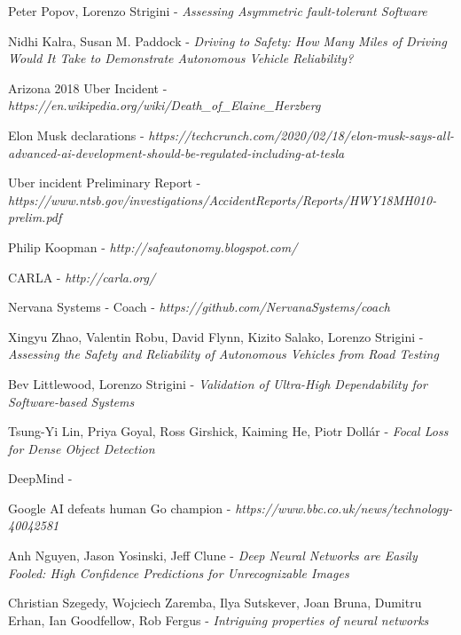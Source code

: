\begin{thebibliography}{9}

Peter Popov, Lorenzo Strigini - \textit{Assessing Asymmetric fault-tolerant Software}

Nidhi Kalra, Susan M. Paddock - \textit{Driving to Safety: How Many Miles of Driving Would It Take to Demonstrate Autonomous Vehicle Reliability?}

Arizona 2018 Uber Incident - \textit{https://en.wikipedia.org/wiki/Death\_of\_Elaine\_Herzberg}

Elon Musk declarations - \textit{https://techcrunch.com/2020/02/18/elon-musk-says-all-advanced-ai-development-should-be-regulated-including-at-tesla}

Uber incident Preliminary Report - \textit{https://www.ntsb.gov/investigations/AccidentReports/Reports/HWY18MH010-prelim.pdf}

Philip Koopman - \textit{http://safeautonomy.blogspot.com/}

CARLA - \textit{http://carla.org/}

Nervana Systems - Coach - \textit{https://github.com/NervanaSystems/coach}

Xingyu Zhao, Valentin Robu, David Flynn, Kizito Salako, Lorenzo Strigini - \textit{Assessing the Safety and Reliability of Autonomous Vehicles from Road Testing}

Bev Littlewood, Lorenzo Strigini - \textit{Validation of Ultra-High Dependability for Software-based Systems}

Tsung-Yi Lin, Priya Goyal, Ross Girshick, Kaiming He, Piotr Dollár - \textit{Focal Loss for Dense Object Detection}

DeepMind - 

Google AI defeats human Go champion - \textit{https://www.bbc.co.uk/news/technology-40042581}

Anh Nguyen, Jason Yosinski, Jeff Clune - \textit{Deep Neural Networks are Easily Fooled: High Confidence Predictions for Unrecognizable Images}

Christian Szegedy, Wojciech Zaremba, Ilya Sutskever, Joan Bruna, Dumitru Erhan, Ian Goodfellow, Rob Fergus - \textit{Intriguing properties of neural networks}


\end{thebibliography}
